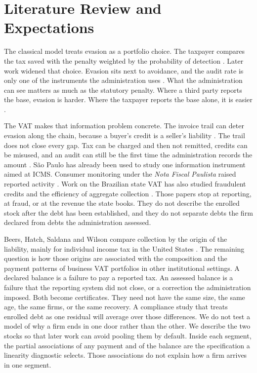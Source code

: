 \section{Literature Review and Expectations}\label{sec:literature}

The classical model treats evasion as a portfolio choice.
The taxpayer compares the tax saved with the penalty weighted by the probability of detection \citep{allingham1972}.
Later work widened that choice.
Evasion sits next to avoidance, and the audit rate is only one of the instruments the administration uses \citep{slemrod2007,slemrod2002}.
What the administration can see matters as much as the statutory penalty.
Where a third party reports the base, evasion is harder.
Where the taxpayer reports the base alone, it is easier \citep{kleven2011}.

The VAT makes that information problem concrete.
The invoice trail can deter evasion along the chain, because a buyer's credit is a seller's liability \citep{pomeranz2015}.
The trail does not close every gap.
Tax can be charged and then not remitted, credits can be misused, and an audit can still be the first time the administration records the amount \citep{keen2006}.
S\~ao Paulo has already been used to study one information instrument aimed at ICMS.
Consumer monitoring under the \emph{Nota Fiscal Paulista} raised reported activity \citep{naritomi2019}.
Work on the Brazilian state VAT has also studied fraudulent credits and the efficiency of aggregate collection \citep{gomes2024,cabello2020}.
Those papers stop at reporting, at fraud, or at the revenue the state books.
They do not describe the enrolled stock after the debt has been established, and they do not separate debts the firm declared from debts the administration assessed.

Beers, Hatch, Saldana and Wilson compare collection by the origin of the liability, mainly for individual income tax in the United States \citep{beers2015collectibility}.
The remaining question is how those origins are associated with the composition and the payment patterns of business VAT portfolios in other institutional settings.
A declared balance is a failure to pay a reported tax.
An assessed balance is a failure that the reporting system did not close, or a correction the administration imposed.
Both become certificates.
They need not have the same size, the same age, the same firms, or the same recovery.
A compliance study that treats enrolled \vat{} debt as one residual will average over those differences.
We do not test a model of why a firm ends in one door rather than the other.
We describe the two stocks so that later work can avoid pooling them by default.
Inside each segment, the partial associations of any payment and of the balance are the specification a linearity diagnostic selects.
Those associations do not explain how a firm arrives in one segment.


